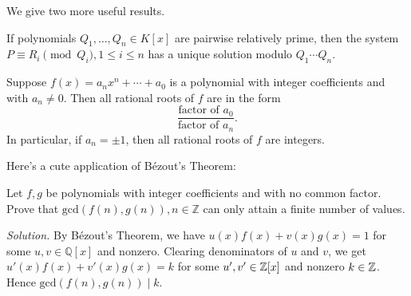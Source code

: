 We give two more useful results.

\begin{thm}  If polynomials $Q_1,\ldots, Q_n\in K[x]$ are pairwise relatively prime, then the system $P\equiv R_i\pmod{Q_i}, 1\leq i\leq n$ has a unique solution modulo $Q_1\cdots Q_n$.
\end{thm}

\begin{thm}
Suppose $f(x)=a_nx^n+\cdots +a_0$ is a polynomial with integer coefficients and with $a_n\neq 0$. Then all rational roots of $f$ are in the form
\[
\frac{
\text{factor of }a_0}{\text{factor of }a_n}.
\]
In particular, if $a_n=\pm 1$, then all rational roots of $f$ are integers.
\end{thm}

Here's a cute application of B\'ezout's Theorem:
\begin{ex}
Let $f,g$ be polynomials with integer coefficients and with no common factor. Prove that $\text{gcd}(f(n),g(n)),n\in \mathbb Z$ can only attain a finite number of values.
\end{ex}
{\it Solution.} By B\'ezout's Theorem, we have $u(x)f(x)+v(x)g(x)=1$ for some $u,v\in \mathbb{Q}[x]$ and nonzero. Clearing denominators of $u$ and $v$, we get $u'(x)f(x)+v'(x)g(x)=k$ for some $u',v'\in \mathbb{Z}[x]$ and nonzero $k\in \mathbb{Z}$. Hence $\text{gcd}(f(n),g(n))\mid k$.

